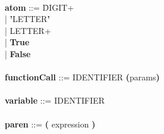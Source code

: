\begin{tabbing}
            \\
            {\bf atom}                        ::= \=DIGIT+\\
                                                  \>| \textbf{'}LETTER\textbf{'}\\
                                                  \>| LETTER+\\
                                                  \>| \textbf{True}\\
                                                  \>| \textbf{False}\\
            \\   
            {\bf functionCall}                ::= IDENTIFIER \textbf{(}params\textbf{)} \\
            \\      
            {\bf variable}                    ::= IDENTIFIER \\
            \\ 
            {\bf paren}                       ::= \textbf{(} expression \textbf{)}\\
        \end{tabbing}
